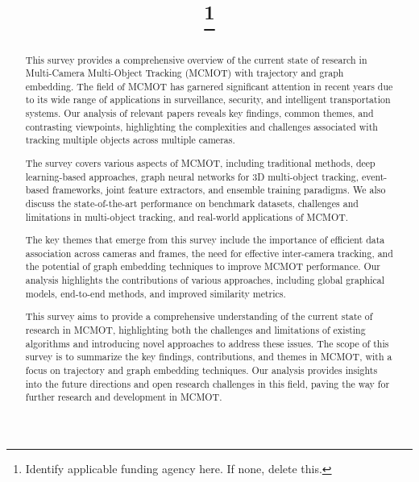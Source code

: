 \documentclass[conference]{IEEEtran}
\begin{document}
\title{
\thanks{Identify applicable funding agency here. If none, delete this.}
}

\author{
\and
{}
}

\maketitle

\begin{abstract}
This survey provides a comprehensive overview of the current state of research in Multi-Camera Multi-Object Tracking (MCMOT) with trajectory and graph embedding. The field of MCMOT has garnered significant attention in recent years due to its wide range of applications in surveillance, security, and intelligent transportation systems. Our analysis of relevant papers reveals key findings, common themes, and contrasting viewpoints, highlighting the complexities and challenges associated with tracking multiple objects across multiple cameras.

The survey covers various aspects of MCMOT, including traditional methods, deep learning-based approaches, graph neural networks for 3D multi-object tracking, event-based frameworks, joint feature extractors, and ensemble training paradigms. We also discuss the state-of-the-art performance on benchmark datasets, challenges and limitations in multi-object tracking, and real-world applications of MCMOT.

The key themes that emerge from this survey include the importance of efficient data association across cameras and frames, the need for effective inter-camera tracking, and the potential of graph embedding techniques to improve MCMOT performance. Our analysis highlights the contributions of various approaches, including global graphical models, end-to-end methods, and improved similarity metrics.

This survey aims to provide a comprehensive understanding of the current state of research in MCMOT, highlighting both the challenges and limitations of existing algorithms and introducing novel approaches to address these issues. The scope of this survey is to summarize the key findings, contributions, and themes in MCMOT, with a focus on trajectory and graph embedding techniques. Our analysis provides insights into the future directions and open research challenges in this field, paving the way for further research and development in MCMOT.
\end{abstract}
\end{document}

